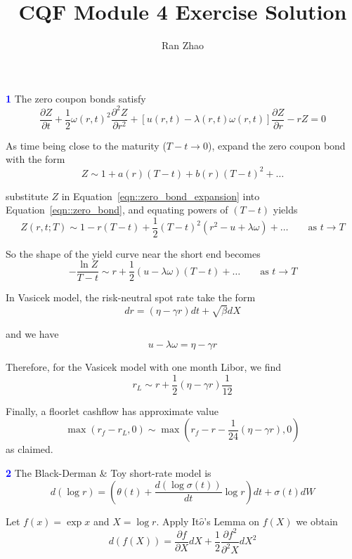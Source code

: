 \documentclass[a4paper,11pt] {article}
\author{Ran Zhao}
\title{CQF Module 4 Exercise Solution}
\date{}
\begin{document}
\maketitle


\textcolor{blue}{\bf 1 } The zero coupon bonds satisfy
\begin{equation} \label{eqn::zero_bond}
\frac{\partial Z}{\partial t} + \frac{1}{2} \omega(r,t)^2 \frac{\partial^2 Z}{\partial r^2} + [u(r,t)-\lambda(r,t)\omega(r,t)] \frac{\partial Z}{\partial r} - rZ = 0
\end{equation}

As time being close to the maturity ($T-t\rightarrow 0$), expand the zero coupon bond with the form
\begin{equation} \label{eqn::zero_bond_expansion}
Z\sim 1 + a(r)(T-t) + b(r)(T-t)^2 + \ldots
\end{equation}

substitute $Z$ in Equation~\ref{eqn::zero_bond_expansion} into Equation~\ref{eqn::zero_bond}, and equating powers of $(T-t)$ yields
$$
Z(r,t;T)\sim 1 -r(T-t) + \frac{1}{2}(T-t)^2(r^2-u+\lambda\omega) + \ldots \qquad \textrm{as } t\rightarrow T
$$

So the shape of the yield curve near the short end becomes
$$
-\frac{\ln Z}{T-t} \sim r + \frac{1}{2}(u-\lambda\omega)(T-t) + \ldots \qquad \textrm{as } t\rightarrow T
$$

In Vasicek model, the risk-neutral spot rate take the form
$$
dr = (\eta-\gamma r) dt + \sqrt{\beta} dX
$$

and we have
$$
u-\lambda\omega = \eta-\gamma r
$$

Therefore, for the Vasicek model with one month Libor, we find
$$
r_L \sim r + \frac{1}{2}(\eta-\gamma r) \frac{1}{12}
$$

Finally, a floorlet cashflow has approximate value
$$
\max(r_f - r_L, 0) \sim \max\left(r_f - r - \frac{1}{24} (\eta-\gamma r), 0\right)
$$
as claimed.

\bigskip

\textcolor{blue}{\bf 2 } The Black-Derman \& Toy short-rate model is
\begin{equation} \label{eqn::BDT}
d(\log r) = \left( \theta(t) + \frac{d(\log\sigma(t))}{dt} \log r \right) dt + \sigma(t) dW
\end{equation}

Let $f(x) = \exp x$ and $X = \log r$. Apply It$\hat{o}$'s Lemma on $f(X)$ we obtain
$$
d(f(X)) = \frac{\partial f}{\partial X} dX + \frac{1}{2} \frac{\partial f^2}{\partial^2 X} dX^2
$$
\end{document}
